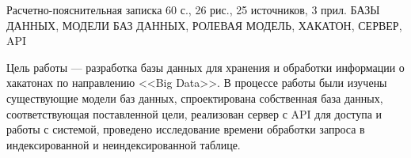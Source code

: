 
Расчетно-пояснительная записка 60 с., 26 рис., 25 источников, 3 прил.\newline
БАЗЫ ДАННЫХ, МОДЕЛИ БАЗ ДАННЫХ, РОЛЕВАЯ МОДЕЛЬ,
ХАКАТОН, СЕРВЕР, API

Цель работы — разработка базы данных для хранения и обработки информации о хакатонах по направлению <<Big Data>>.
В процессе работы были изучены существующие модели баз данных,
спроектирована собственная база данных, соответствующая поставленной цели, реализован сервер с API для доступа и работы с системой, проведено исследование времени обработки запроса в индексированной и неиндексированной таблице.